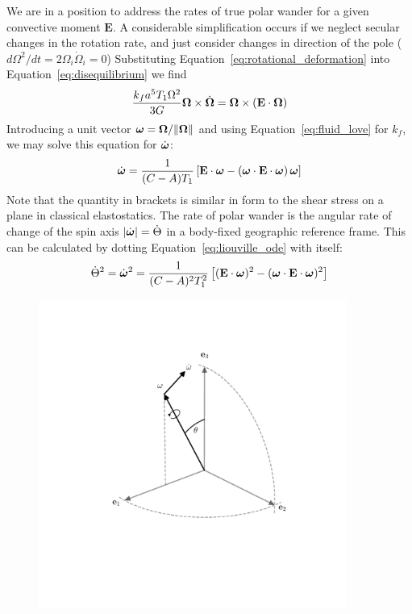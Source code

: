 \documentclass[extra,mreferee]{gji}
\begin{document}
We are in a position to address the rates of true polar wander for a given convective moment $\mathbf{E}$.
A considerable simplification occurs if we neglect secular changes in the rotation rate, and just consider changes in direction of the pole ($d \Omega^2 / dt = 2 {\Omega_i} \dot{ \Omega}_i = 0$)
Substituting Equation~\eqref{eq:rotational_deformation} into Equation~\eqref{eq:disequilibrium} we find
\begin{equation}
\frac{k_f a^5 T_1 \Omega^2}{3G}\mitbf{\Omega} \times \dot{\mitbf{\Omega} } = \mitbf{\Omega} \times \left( \mathbf{E} \cdot \mitbf{\Omega} \right)
\label{eq:liouville}
\end{equation}
Introducing a unit vector $\mitbf{\omega} = \mitbf{\Omega}/\|\mitbf{\Omega} \|$ and using Equation~\eqref{eq:fluid_love} for $k_f$,  we may solve this equation for $\dot{\mitbf{\omega}}$:
\begin{equation}
 \dot{\mitbf{\omega}}  = \frac{1}{(C-A)T_1} \left[ \mathbf{E} \cdot \mitbf{\omega} - \left( \mitbf{\omega} \cdot \mathbf{E} \cdot \mitbf{\omega}  \right) \mitbf{\omega} \right]
\label{eq:liouville_ode}
\end{equation}
Note that the quantity in brackets is similar in form to the shear stress on a plane in classical elastostatics.
The rate of polar wander is the angular rate of change of the spin axis $\left| \dot{\mitbf{\omega}} \right| = \dot{\Theta}$ in a body-fixed geographic reference frame.
This can be calculated by dotting Equation~\eqref{eq:liouville_ode} with itself:
\begin{equation}
\dot{\Theta}^2 = \dot{\mitbf{\omega}}^2 = \frac{1}{(C-A)^2 T_1^2} \left[ (\mathbf{E}\cdot\mitbf{\omega})^2 - (\mitbf{\omega}\cdot\mathbf{E}\cdot\mitbf{\omega})^2 \right]
\label{eq:polar_wander_rate_tensor}
\end{equation}

\begin{figure}
\centering
\includegraphics[width=0.9\textwidth]{figures/reference_frames.pdf}
\caption{ }
\label{fig:eigengap}
\end{figure}
\end{document}
